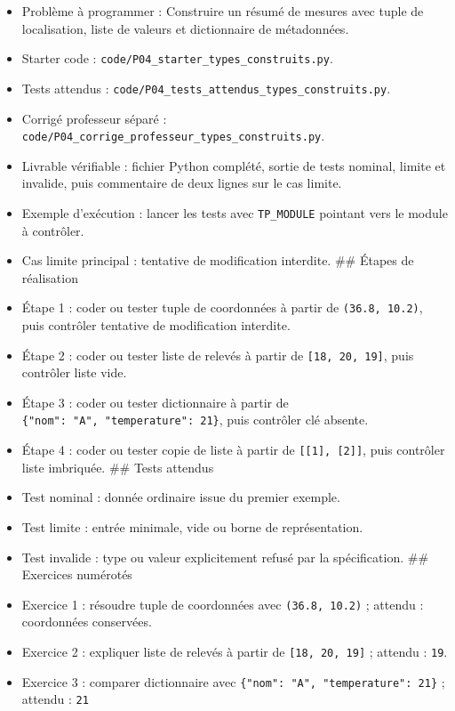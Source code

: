\begin{itemize}
\tightlist
\item
  Problème à programmer : Construire un résumé de mesures avec tuple de
  localisation, liste de valeurs et dictionnaire de métadonnées.
\item
  Starter code : \texttt{code/P04\_starter\_types\_construits.py}.
\item
  Tests attendus :
  \texttt{code/P04\_tests\_attendus\_types\_construits.py}.
\item
  Corrigé professeur séparé :
  \texttt{code/P04\_corrige\_professeur\_types\_construits.py}.
\item
  Livrable vérifiable : fichier Python complété, sortie de tests
  nominal, limite et invalide, puis commentaire de deux lignes sur le
  cas limite.
\item
  Exemple d'exécution : lancer les tests avec \texttt{TP\_MODULE}
  pointant vers le module à contrôler.
\item
  Cas limite principal : tentative de modification interdite. \#\#
  Étapes de réalisation
\item
  Étape 1 : coder ou tester tuple de coordonnées à partir de
  \texttt{(36.8,\ 10.2)}, puis contrôler tentative de modification
  interdite.
\item
  Étape 2 : coder ou tester liste de relevés à partir de
  \texttt{{[}18,\ 20,\ 19{]}}, puis contrôler liste vide.
\item
  Étape 3 : coder ou tester dictionnaire à partir de
  \texttt{\{"nom":\ "A",\ "temperature":\ 21\}}, puis contrôler clé
  absente.
\item
  Étape 4 : coder ou tester copie de liste à partir de
  \texttt{{[}{[}1{]},\ {[}2{]}{]}}, puis contrôler liste imbriquée. \#\#
  Tests attendus
\item
  Test nominal : donnée ordinaire issue du premier exemple.
\item
  Test limite : entrée minimale, vide ou borne de représentation.
\item
  Test invalide : type ou valeur explicitement refusé par la
  spécification. \#\# Exercices numérotés
\item
  Exercice 1 : résoudre tuple de coordonnées avec \texttt{(36.8,\ 10.2)}
  ; attendu : coordonnées conservées.
\item
  Exercice 2 : expliquer liste de relevés à partir de
  \texttt{{[}18,\ 20,\ 19{]}} ; attendu : \texttt{19}.
\item
  Exercice 3 : comparer dictionnaire avec
  \texttt{\{"nom":\ "A",\ "temperature":\ 21\}} ; attendu : \texttt{21}

\end{itemize}

